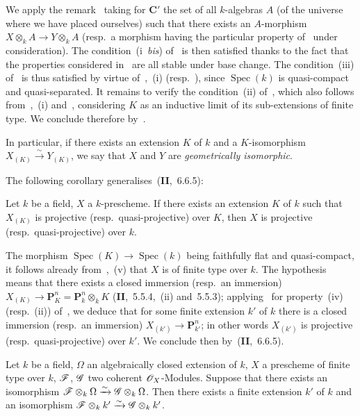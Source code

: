 We apply the remark~ taking for $\boldsymbol{C}'$ the set of all $k$-algebras $A$ (of the universe where we have placed ourselves) such that there exists an $A$-morphism $X\otimes_k A\to Y\otimes_k A$ (resp.\ a morphism having the particular property of~ under consideration).
The condition~(i~\emph{bis}) of~ is then satisfied thanks to the fact that the
properties considered in~ are all stable under base change.
The condition~(iii) of~ is thus satisfied by virtue of~,~(i) (resp.\ ), since $\operatorname{Spec}(k)$ is quasi-compact and quasi-separated.
It remains to verify the condition~(ii) of~, which also follows from~,~(i) and~, considering $K$ as an inductive limit of its sub-extensions of finite type.
We conclude therefore by~.

In particular, if there exists an extension $K$ of $k$ and a $K$-isomorphism $X_{(K)}\xrightarrow{\sim} Y_{(K)}$, we say that $X$ and $Y$ are \emph{geometrically isomorphic}.

The following corollary generalises~(\textbf{II},~6.6.5):

\begin{corollary}[9.1.5]
\label{IV.9.1.5}
Let $k$ be a field, $X$ a $k$-prescheme.
If there exists an extension $K$ of $k$ such that $X_{(K)}$ is projective \textnormal{(resp.}\ quasi-projective\textnormal{)} over $K$, then $X$ is projective \textnormal{(resp.}\ quasi-projective\textnormal{)} over $k$.
\end{corollary}

The morphism $\operatorname{Spec}(K)\to\operatorname{Spec}(k)$ being faithfully flat and quasi-compact, it follows already from~,~(v) that $X$ is of finite type over $k$.
The hypothesis means that there exists a closed immersion (resp.\ an immersion) $X_{(K)}\to\mathbf{P}_K^n=\mathbf{P}_k^n\otimes_k K$ (\textbf{II},~5.5.4,~(ii) and~5.5.3); applying~ for property~(iv) (resp.~(ii)) of~, we deduce that for some finite extension $k'$ of $k$ there is a closed immersion (resp.\ an immersion) $X_{(k')}\to\mathbf{P}_{k'}^n$; in other words $X_{(k')}$ is projective (resp.\ quasi-projective) over $k'$.
We conclude then by~(\textbf{II},~6.6.5).

\begin{proposition}[9.1.6]
\label{IV.9.1.6}
Let $k$ be a field, $\Omega$ an algebraically closed extension of $k$, $X$ a prescheme of finite type over $k$, $\mathscr{F}$, $\mathscr{G}$ two coherent $\mathscr{O}_X$-Modules.
Suppose that there exists an isomorphism $\mathscr{F}\otimes_k\Omega\xrightarrow{\sim}\mathscr{G}\otimes_k\Omega$.
Then there exists a finite extension $k'$ of $k$ and an isomorphism $\mathscr{F}\otimes_k k'\xrightarrow{\sim}\mathscr{G}\otimes_k k'$.
\end{proposition}

